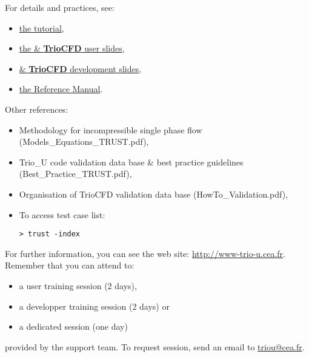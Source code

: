 For details and practices, see:
\begin{itemize}
\item \href{TRUST_tutorial.pdf}{the \trust tutorial},
\item \href{TRUST_and_TrioCFD_presentation.pdf}{the \trust \& \textbf{TrioCFD} user slides},
\item \href{Developer\_TRUST\_presentation.pdf}{\trust \& \textbf{TrioCFD} development slides},
\item \href{\REFERENCEMANUAL}{the \trustref Reference Manual}.
\end{itemize}

Other references:
\begin{itemize}
\item Methodology for incompressible single phase flow (Models\_Equations\_TRUST.pdf),
\item Trio\_U code validation data base \& best practice guidelines (Best\_Practice\_TRUST.pdf),
\item Organisation of TrioCFD validation data base (HowTo\_Validation.pdf),
\item To access \trust test case list:
\begin{verbatim}
> trust -index
\end{verbatim}
\end{itemize}
\vspace{0.5cm}

For further information, you can see the \trust web site: \href{http://www-trio-u.cea.fr}{http://www-trio-u.cea.fr}.\\

Remember that you can attend to:
\begin{itemize}
\item a user training session (2 days),
\item a developper training session (2 days) or 
\item a dedicated session (one day)
\end{itemize}
provided by the support team.
To request session, send an email to \href{mailto:triou@cea.fr}{triou@cea.fr}.

